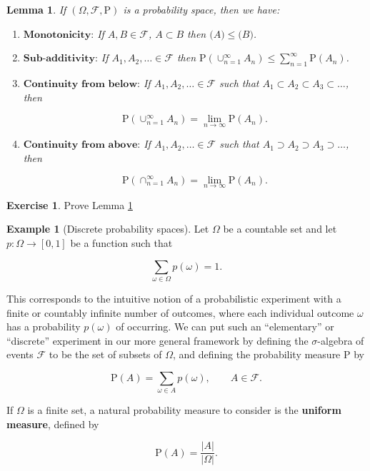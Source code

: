 \documentclass[11pt]{report}
\providecommand{\cal}{\mathcal}
\theoremstyle{plain}
\newtheorem{lem}[thm]{Lemma}
\theoremstyle{definition}
\newtheorem{example}[thm]{Example}
\newtheorem{xexercise}[thm]{Exercise}
\begin{document}
\begin{lem}
\label{probspaceproperties}
If $(\Omega, {\cal F}, \mathrm{P})$ is a probability
space, then we have:

\begin{enumerate}[label=(\roman*)]
\item $\textbf{Monotonicity:}$ If $A,B \in {\cal F}$,
$A\subset B$ then $\mathrm(A)\le \mathrm(B)$.

\item $\textbf{Sub-additivity:}$ If
$A_1,A_2,\ldots \in {\cal F}$ then
$\mathrm{P}(\cup_{n=1}^\infty A_n) \le
\sum_{n=1}^\infty \mathrm{P}(A_n)$.

\item $\textbf{Continuity from below:}$ If
$A_1,A_2,\ldots \in {\cal F}$ such that
$A_1 \subset A_2 \subset A_3 \subset \ldots$, then

\[
\mathrm{P}(\cup_{n=1}^\infty A_n) = \lim_{n\to\infty} \mathrm{P}(A_n).
\]

\item $\textbf{Continuity from above:}$ If
$A_1,A_2,\ldots \in {\cal F}$ such that
$A_1 \supset A_2 \supset A_3 \supset \ldots$, then

\[
\mathrm{P}(\cap_{n=1}^\infty A_n) = \lim_{n\to\infty} \mathrm{P}(A_n).
\]
\end{enumerate}

\end{lem}

\begin{xexercise}
Prove Lemma \ref{probspaceproperties}
\end{xexercise}

\begin{example}[Discrete probability spaces]
Let $\Omega$ be a countable set and let
$p:\Omega\to[0,1]$ be a function such that

\[
\sum_{\omega \in \Omega} p(\omega) = 1.
\]

This corresponds to the intuitive notion of a
probabilistic experiment with a finite or countably
infinite number of outcomes, where each individual
outcome $\omega$ has a probability $p(\omega)$ of
occurring. We can put such an ``elementary'' or
``discrete'' experiment in our more general framework
by defining the $\sigma$-algebra of events ${\cal F}$
to be the set of subsets of $\Omega$, and defining
the probability measure $\mathrm{P}$ by

\[
\mathrm{P}(A) = \sum_{\omega \in A} p(\omega), \qquad A\in {\cal F}.
\]

If $\Omega$ is a finite set, a natural probability
measure to consider is the \textbf{uniform measure},
defined by

\[
\mathrm{P}(A) = \frac{|A|}{|\Omega|}.
\]

\end{example}
\end{document}
